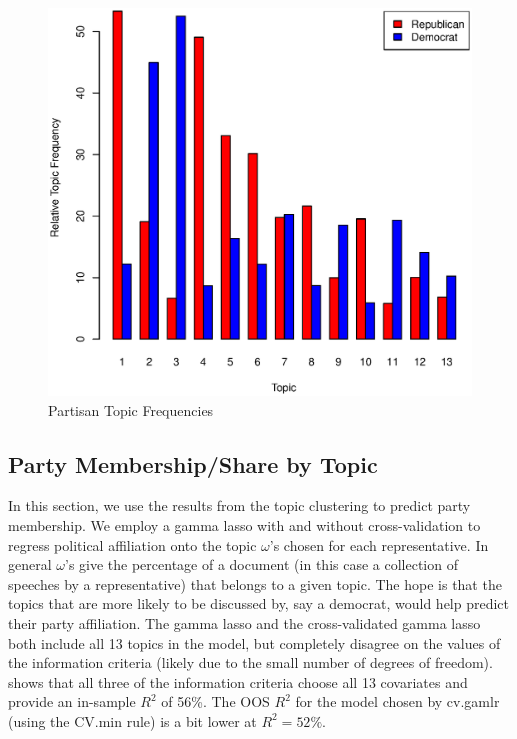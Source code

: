 \documentclass[11pt, fleqn]{article}
\begin{document}
\begin{figure}[!htb]
  \centering
  \includegraphics[scale=.5]{topic.eps}
  \caption{Partisan Topic Frequencies}
  \label{fig:topic}
\end{figure}



\subsection{Party Membership/Share by Topic}

In this section, we use the results from the topic clustering to predict party membership.  We employ a gamma lasso with and without cross-validation to regress political affiliation onto the topic $\omega$'s chosen for each representative.  In general $\omega$'s give the percentage of a document (in this case a collection of speeches by a representative) that belongs to a given topic.  The hope is that the topics that are more likely to be discussed by, say a democrat, would help predict their party affiliation.  The gamma lasso and the cross-validated gamma lasso both include all 13 topics in the model, but completely disagree on the values of the information criteria (likely due to the small number of degrees of freedom).   shows that all three of the information criteria choose all 13 covariates and provide an in-sample $R^2$ of 56\%.  The OOS $R^2$ for the model chosen by cv.gamlr (using the CV.min rule) is a bit lower at $R^2=52\%$.
\end{document}
